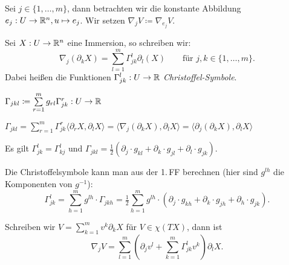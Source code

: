 \documentclass{cheat-sheet}
\begin{document}

\begin{nota}
  Sei $j \in \{1, \ldots, m\}$, dann betrachten wir die konstante Abbildung $e_j : U \to \mathbb{R}^n, u \mapsto e_j$. Wir setzen $\nabla_j V \coloneqq \nabla_{e_j} V$.
\end{nota}

\begin{defn}
  Sei $X : U \to \mathbb{R}^n$ eine Immersion, so schreiben wir:
  \[ \nabla_j (\partial_k X) = \sum_{l=1}^m \Gamma_{jk}^l \partial_l (X)  \qquad \text{für $j,k \in \{ 1, \ldots, m \}$.} \]
  Dabei heißen die Funktionen $\Gamma_{jk}^l : U \to \mathbb{R}$ \emph{Christoffel-Symbole}.
\end{defn}

\begin{nota}
  $\Gamma_{jkl} \coloneqq \sum_{r=1}^m g_{rl} \Gamma_{jk}^r : U \to \R$
\end{nota}

\begin{satz}
  $\Gamma_{jkl}\!=\!\sum_{r=1}^m \Gamma_{jk}^{r} \langle \partial_r X, \partial_l X \rangle\!=\!\langle \nabla_j (\partial_k X), \partial_l X \rangle\!=\!\langle \partial_j (\partial_k X), \partial_l X \rangle$
\end{satz}

\begin{satz}
    Es gilt $\Gamma_{jk}^l = \Gamma_{kj}^l \,\, \text{und} \,\, \Gamma_{jkl} = \tfrac{1}{2} (\partial_j \cdot g_{kl} + \partial_k \cdot g_{jl} + \partial_l \cdot g_{jk})$.
\end{satz}

\begin{bem}
  Die Christoffelsymbole kann man aus der 1.\,FF berechnen (hier sind $g^{lh}$ die Komponenten von $g^{-1}$):
  \[
    \Gamma_{jk}^l = \sum_{h=1}^m g^{lh} \cdot \Gamma_{jkh} 
    = \tfrac{1}{2} \sum_{h=1}^m g^{lh} \cdot (\partial_j \cdot g_{kh} + \partial_k \cdot g_{jh} + \partial_h \cdot g_{jk}).
  \]
\end{bem}

\begin{bem}
  Schreiben wir $V = \sum_{k=1}^m v^k \partial_k X$ für $V \in \chi(TX)$, dann ist
  \[ \nabla_j V = \sum_{l=1}^m \left( \partial_j v^l + \sum_{k=1}^m \Gamma_{jk}^l v^k \right) \partial_l X. \]
\end{bem}


\end{document}

